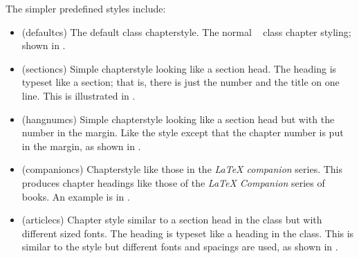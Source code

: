 The simpler predefined styles include:
\begin{itemize}
\item[\cstyle{default}]
\glossary(defaultcs)%
  {}%
  {The default  class chapterstyle.}
The normal \ltx\  class chapter styling; shown in .

\item[\cstyle{section}]
\glossary(sectioncs)%
  {}%
  {Simple chapterstyle looking like a section head.}
The heading is typeset like a section; that is,
there is just the number and the title on one line. This is illustrated
in .

\item[\cstyle{hangnum}]
\glossary(hangnumcs)%
  {}%
  {Simple chapterstyle looking like a section head but with the number in the margin.}
Like the  style except that the chapter
number is put in the margin, as shown in .

\item[\cstyle{companion}]
\glossary(companioncs)%
  {}%
  {Chapterstyle like those in the \textit{LaTeX companion} series.}
 This produces chapter headings like those of the
\textit{LaTeX Companion} series of books. An example is in .

\item[\cstyle{article}]
\glossary(articlecs)%
  {}%
  {Chapter style similar to a section head in the  class but
   with different
   sized fonts.}
 The heading is typeset like a \cmd{\section}
heading in the  class. This is similar to the
 style but different fonts and spacings are used,
as shown in .


\end{itemize}
